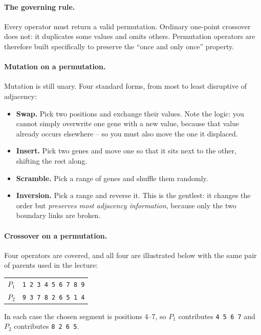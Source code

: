 \documentclass[11pt,a4paper]{article}
\begin{document}
\paragraph{The governing rule.}
Every operator must return a valid permutation. Ordinary one-point crossover
does not: it duplicates some values and omits others. Permutation operators
are therefore built specifically to preserve the ``once and only once''
property.

\paragraph{Mutation on a permutation.} Mutation is still unary. Four standard
forms, from most to least disruptive of adjacency:
\begin{itemize}
\item \textbf{Swap.} Pick two positions and exchange their values. Note the
      logic: you cannot simply overwrite one gene with a new value, because
      that value already occurs elsewhere -- so you must also move the one it
      displaced.
\item \textbf{Insert.} Pick two genes and move one so that it sits next to
      the other, shifting the rest along.
\item \textbf{Scramble.} Pick a range of genes and shuffle them randomly.
\item \textbf{Inversion.} Pick a range and reverse it. This is the gentlest:
      it changes the order but \emph{preserves most adjacency information},
      because only the two boundary links are broken.
\end{itemize}

\paragraph{Crossover on a permutation.}
Four operators are covered, and all four are illustrated below with the same
pair of parents used in the lecture:
\begin{center}
\begin{tabular}{@{}ll@{}}
\toprule
$P_1$ & \texttt{1\ 2\ 3\ 4\ 5\ 6\ 7\ 8\ 9}\\
$P_2$ & \texttt{9\ 3\ 7\ 8\ 2\ 6\ 5\ 1\ 4}\\
\bottomrule
\end{tabular}
\end{center}
\noindent In each case the chosen segment is positions 4--7, so $P_1$
contributes \texttt{4\ 5\ 6\ 7} and $P_2$ contributes \texttt{8\ 2\ 6\ 5}.
\end{document}
